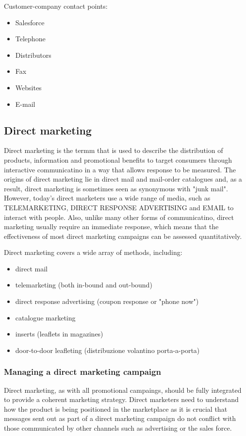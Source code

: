 \documentclass{article}
\begin{document}
Customer-company contact points:
\begin{itemize}
    \item Salesforce
    \item Telephone
    \item Distributors
    \item Fax
    \item Websites
    \item E-mail
\end{itemize}

\subsection{Direct marketing}
Direct marketing is the termm that is used to describe the distribution of products, information and promotional benefits to target consumers through interactive communicatino in a way that allows response to be measured. The origins of direct marketing lie in direct mail and mail-order catalogues and, as a result, direct marketing is sometimes seen as synonymous with "junk mail". However, today's direct marketers use a wide range of media, such as TELEMARKETING, DIRECT RESPONSE ADVERTISING and EMAIL to interact with people. Also, unlike many other forms of communicatino, direct marketing usually require an immediate response, which means that the effectiveness of most direct marketing campaigns can be assessed quantitatively.

Direct marketing covers a wide array of methods, including:
\begin{itemize}
    \item direct mail
    \item telemarketing (both in-bound and out-bound)
    \item direct response advertising (coupon response or "phone now")
    \item catalogue marketing
    \item inserts (leaflets in magazines)
    \item door-to-door leafleting (distribuzione volantino porta-a-porta)
\end{itemize}

\subsubsection{Managing a direct marketing campaign}
Direct marketing, as with all promotional campaings, should be fully integrated to provide a coherent marketing strategy. Direct marketers need to understand how the product is being positioned in the marketplace as it is crucial that messages sent out as part of a direct marketing campaign do not conflict with those communicated by other channels such as advertising or the sales force. 
\end{document}
